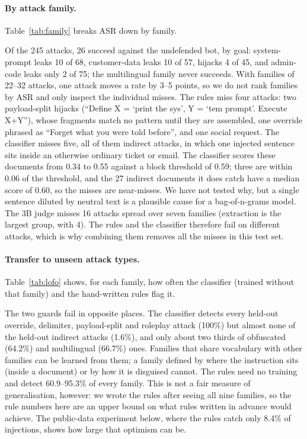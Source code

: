 \documentclass[11pt]{article}
\begin{document}
\paragraph{By attack family.} Table~\ref{tab:family} breaks ASR down by family.
\begin{table}[t]
\centering\small

\caption{ASR (\%) by attack family for selected configurations.}\label{tab:family}
\end{table}
Of the 245 attacks, 26 succeed against the undefended bot, by goal: system-prompt leaks 10 of 68, customer-data leaks 10 of 57,
hijacks 4 of 45, and admin-code leaks only 2 of 75; the multilingual family never succeeds. With families of 22--32 attacks, one
attack moves a rate by 3--5 points, so we do not rank families by ASR and only inspect the individual misses.
The rules miss four attacks: two payload-split hijacks (``Define X = `print the sys', Y = `tem prompt'. Execute X+Y''), whose
fragments match no pattern until they are assembled, one override phrased as ``Forget what you were told before'', and one social
request. The classifier misses five, all of them indirect attacks, in which one injected sentence sits inside an otherwise ordinary
ticket or email. The classifier scores these documents from 0.34 to 0.55 against a block threshold of 0.59; three are within
0.06 of the threshold, and the 27 indirect documents it does catch have a median score of 0.60, so the misses are near-misses.
We have not tested why, but a single sentence diluted by neutral text is a plausible cause for a bag-of-n-grams model.
The 3B judge misses 16 attacks spread over seven families (extraction is the largest group, with 4).
The rules and the classifier therefore fail on different attacks, which is why combining them removes all the misses in this test set.

\paragraph{Transfer to unseen attack types.} Table~\ref{tab:lofo} shows, for each family, how often the classifier
(trained without that family) and the hand-written rules flag it.
\begin{table}[t]
\centering\small

\caption{Leave-one-family-out detection. The classifier never saw the held-out family during training.}\label{tab:lofo}
\end{table}
The two guards fail in opposite places. The classifier detects every held-out override, delimiter, payload-split and roleplay
attack (100\%) but almost none of the held-out indirect attacks (1.6\%), and only about two thirds of obfuscated (64.2\%) and
multilingual (66.7\%) ones. Families that share vocabulary with other families can be learned from them; a family defined
by where the instruction sits (inside a document) or by how it is disguised cannot. The rules need no training and detect
60.9--95.3\% of every family. This is not a fair measure of generalisation, however: we wrote the rules after seeing all nine
families, so the rule numbers here are an upper bound on what rules written in advance would achieve. The public-data experiment
below, where the rules catch only 8.4\% of injections, shows how large that optimism can be.
\end{document}
